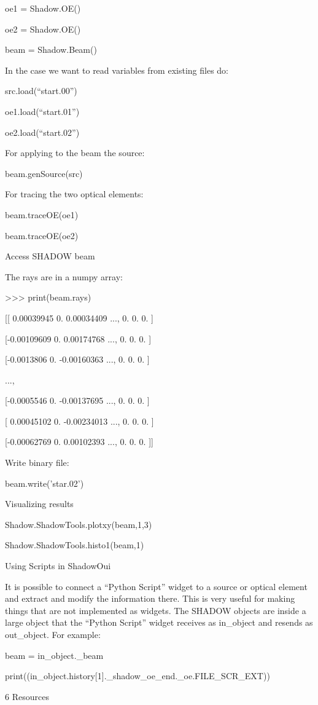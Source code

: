 \documentclass[]{article}
\begin{document}
oe1 = Shadow.OE()

oe2 = Shadow.OE()

beam = Shadow.Beam()

In the case we want to read variables from existing files do:

src.load(``start.00'')

oe1.load(``start.01'')

oe2.load(``start.02'')

For applying to the beam the source:

beam.genSource(src)

For tracing the two optical elements:

beam.traceOE(oe1)

beam.traceOE(oe2)

Access SHADOW beam

The rays are in a numpy array:

\textgreater{}\textgreater{}\textgreater{} print(beam.rays)

{[}{[} 0.00039945 0. 0.00034409 ..., 0. 0. 0. {]}

{[}-0.00109609 0. 0.00174768 ..., 0. 0. 0. {]}

{[}-0.0013806 0. -0.00160363 ..., 0. 0. 0. {]}

...,

{[}-0.0005546 0. -0.00137695 ..., 0. 0. 0. {]}

{[} 0.00045102 0. -0.00234013 ..., 0. 0. 0. {]}

{[}-0.00062769 0. 0.00102393 ..., 0. 0. 0. {]}{]}

Write binary file:

beam.write('star.02')

Visualizing results

Shadow.ShadowTools.plotxy(beam,1,3)

Shadow.ShadowTools.histo1(beam,1)

Using Scripts in ShadowOui

It is possible to connect a ``Python Script'' widget to a source or
optical element and extract and modify the information there. This is
very useful for making things that are not implemented as widgets. The
SHADOW objects are inside a large object that the ``Python Script''
widget receives as in\_object and resends as out\_object. For example:

beam = in\_object.\_beam

print((in\_object.history{[}1{]}.\_shadow\_oe\_end.\_oe.FILE\_SCR\_EXT))

6 Resources
\end{document}
